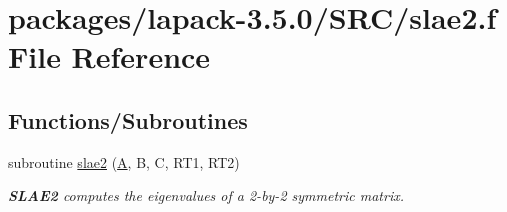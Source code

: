 \hypertarget{slae2_8f}{}\section{packages/lapack-\/3.5.0/\+S\+R\+C/slae2.f File Reference}
\label{slae2_8f}
\subsection*{Functions/\+Subroutines}
\begin{DoxyCompactItemize}
\item 
subroutine \hyperlink{group__auxOTHERauxiliary_gaec32dea47a14590934b8970b078b58fd}{slae2} (\hyperlink{classA}{A}, B, C, R\+T1, R\+T2)
\begin{DoxyCompactList}\small\item\em {\bfseries S\+L\+A\+E2} computes the eigenvalues of a 2-\/by-\/2 symmetric matrix. \end{DoxyCompactList}\end{DoxyCompactItemize}
